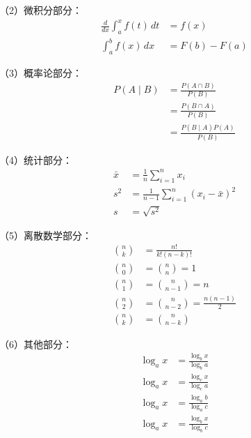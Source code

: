 \begin{ujnbody}
    （2）微积分部分：
    \begin{equation}
        \begin{split}
            \frac{d}{dx} \int_a^x f(t)\,dt &= f(x) \label{eq:1} \\
            \int_a^b f(x)\,dx &= F(b)-F(a)
        \end{split}
    \end{equation}

    （3）概率论部分：
    \begin{equation}
        \begin{split}
            P(A \mid B) &= \frac{P(A \cap B)}{P(B)} \\
            &= \frac{P(B \cap A)}{P(B)} \\
            &= \frac{P(B \mid A)P(A)}{P(B)}
        \end{split}
    \end{equation}

    （4）统计部分：
    \begin{equation}
        \begin{split}
            \bar{x} &= \frac{1}{n}\sum_{i=1}^n x_i \\
            s^2 &= \frac{1}{n-1}\sum_{i=1}^n (x_i-\bar{x})^2 \\
            s &= \sqrt{s^2}
        \end{split}
    \end{equation}

    （5）离散数学部分：
    \begin{equation}
        \begin{split}
            \binom{n}{k} &= \frac{n!}{k!(n-k)!} \\
            \binom{n}{0} &= \binom{n}{n} = 1 \\
            \binom{n}{1} &= \binom{n}{n-1} = n \\
            \binom{n}{2} &= \binom{n}{n-2} = \frac{n(n-1)}{2} \\
            \binom{n}{k} &= \binom{n}{n-k}
        \end{split}
    \end{equation}

    （6）其他部分：
    \begin{equation}
        \begin{split}
            \log_a x &= \frac{\log_b x}{\log_b a} \\
            \log_a x &= \frac{\log_c x}{\log_c a} \\
            \log_a x &= \frac{\log_a b}{\log_a c} \\
            \log_a x &= \frac{\log_b x}{\log_b c}
        \end{split}
    \end{equation}

\end{ujnbody}
